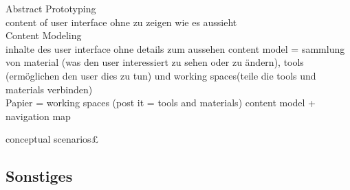  Abstract Prototyping\\
 content of user interface ohne zu zeigen wie es aussieht\\

 Content Modeling \\
 inhalte des user interface ohne details zum aussehen
 content model = sammlung von material (was den user interessiert zu sehen oder zu ändern), tools (ermöglichen den user dies zu tun) und working spaces(teile die tools und materials verbinden)\\

 Papier = working spaces (post it = tools and materials)
 content model + navigation map

 conceptual scenarios£

\subsection{Sonstiges}
